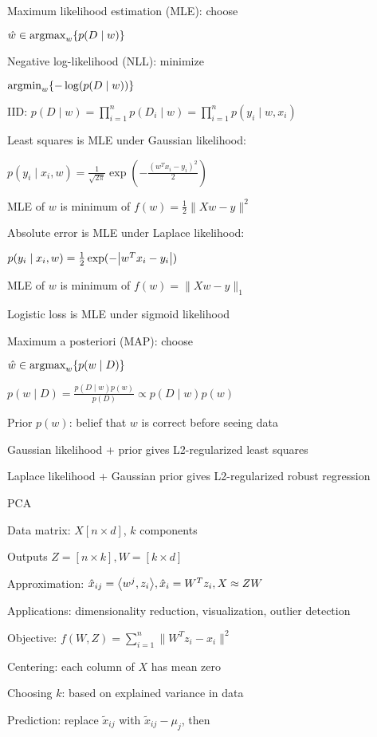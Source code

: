 \documentclass[10pt]{article}
\makeatletter
\newcommand{\tab}{\hspace{.02\textwidth}}
\newcommand{\agb}[1]{\left\langle#1\right\rangle}
\newcommand{\set}[1]{\left\{#1\right\}}
\newcommand{\abs}[1]{\left|#1\right|}
\let\originalleft\left
\let\originalright\right
\renewcommand{\left}{\mathopen{}\mathclose\bgroup\originalleft}
\renewcommand{\right}{\aftergroup\egroup\originalright}
\renewcommand{\section}{\@startsection{section}{1}{0ex}{-1ex}{0.7ex}
                        {\normalfont\normalsize\bfseries}}
\newcommand{\norm}[1]{\lVert #1 \rVert}
\newcommand{\argmin}{\text{argmin}}
\newcommand{\argmax}{\text{argmax}}
\makeatother
\begin{document}
\begin{multicols*}{3}
Maximum likelihood estimation (MLE): choose 

\tab $\hat w\in\argmax_w\set{p(D\mid w)}$

Negative log-likelihood (NLL): minimize 

\tab $\argmin_w\set{-\log(p(D\mid w))}$

IID: $p(D\mid w)=\prod_{i=1}^n p(D_i\mid w)=\prod_{i=1}^n p(y_i\mid w, x_i)$

Least squares is MLE under Gaussian likelihood:

\tab $p(y_i\mid x_i,w)=\frac{1}{\sqrt{2\pi}}\exp(-\frac{(w^Tx_i-y_i)^2}{2})$ 

\tab MLE of $w$ is minimum of $f(w)=\frac 12\norm{Xw-y}^2$

Absolute error is MLE under Laplace likelihood:

\tab $p(y_i\mid x_i,w)=\frac{1}{2}\exp(-\abs{w^Tx_i-y_i})$

\tab MLE of $w$ is minimum of $f(w)=\norm{Xw-y}_1$

Logistic loss is MLE under sigmoid likelihood

Maximum a posteriori (MAP): choose

\tab $\hat w\in\argmax_w\set{p(w\mid D)}$

\tab $p(w\mid D)=\frac{p(D\mid w)p(w)}{p(D)}\propto p(D\mid w)p(w)$

Prior $p(w)$: belief that $w$ is correct before seeing data

Gaussian likelihood + prior gives L2-regularized least squares

Laplace likelihood + Gaussian prior gives L2-regularized robust regression

\section{PCA}

Data matrix: $X[n\times d]$, $k$ components

Outputs $Z=[n\times k],W=[k\times d]$

Approximation: $\hat x_{ij}=\agb{w^j,z_i}, \hat x_i=W^Tz_i, X\approx ZW$

Applications: dimensionality reduction, visualization, outlier detection

Objective: $f(W,Z)=\sum_{i=1}^n\norm{W^Tz_i-x_i}^2$

Centering: each column of $X$ has mean zero

Choosing $k$: based on explained variance in data

Prediction: replace $\tilde x_{ij}$ with $\tilde x_{ij}-\mu_j$, then 


\end{multicols*}
\end{document}
